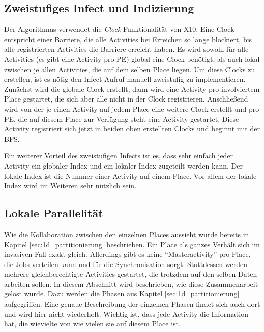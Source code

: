 \subsection{Zweistufiges Infect und Indizierung} %
\label{sub:zweistufiges_infect}
Der Algorithmus verwendet die \textit{Clock}-Funktionalität von X10. Eine Clock entspricht einer Barriere, die alle Activities bei Erreichen so lange blockiert, bis alle registrierten Activities die Barriere erreicht haben. Es wird sowohl für alle Activities (es gibt eine Activity pro PE) global eine Clock benötigt, als auch lokal zwischen je allen Activities, die auf dem selben Place liegen. Um diese Clocks zu erstellen, ist es nötig den Infect-Aufruf manuell zweistufig zu implementieren. Zunächst wird die globale Clock erstellt, dann wird eine Activity pro involviertem Place gestartet, die sich aber alle nicht in der Clock registrieren. Anschließend wird von der je einen Activity auf jedem Place eine weitere Clock erstellt und pro PE, die auf diesem Place zur Verfügung steht eine Activity gestartet. Diese Activity registriert sich jetzt in beiden oben erstellten Clocks und beginnt mit der BFS.

Ein weiterer Vorteil des zweistufigen Infects ist es, dass sehr einfach jeder Activity ein globaler Index und ein lokaler Index zugeteilt werden kann. Der lokale Index ist die Nummer einer Activity auf einem Place. Vor allem der lokale Index wird im Weiteren sehr nützlich sein.

\subsection{Lokale Parallelität} %
\label{sub:lokale_parallelit_t}
Wie die Kollaboration zwischen den einzelnen Places aussieht wurde bereits in Kapitel \ref{sec:1d_partitionierung} beschrieben. Ein Place als ganzes Verhält sich im invasiven Fall exakt gleich. Allerdings gibt es keine \enquote{Masteractivity} pro Place, die Jobs verteilen kann und für die Synchronisation sorgt. Stattdessen werden mehrere gleichberechtigte Activities gestartet, die trotzdem auf den selben Daten arbeiten sollen. In diesem Abschnitt wird beschrieben, wie diese Zusammenarbeit gelöst wurde. Dazu werden die Phasen aus Kapitel \ref{sec:1d_partitionierung} aufgegriffen. Eine genaue Beschreibung der einzelnen Phasen findet sich auch dort und wird hier nicht wiederholt. Wichtig ist, dass jede Activity die Information hat, die wievielte von wie vielen sie auf diesem Place ist.

